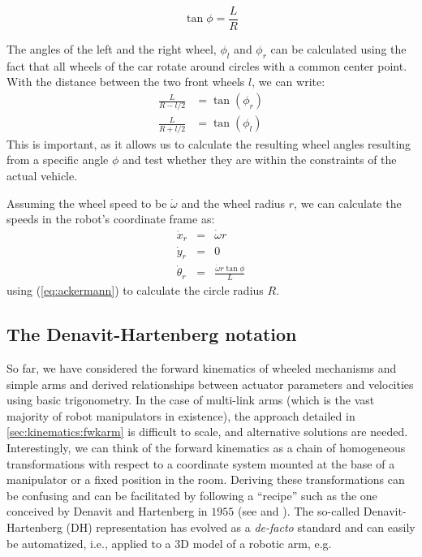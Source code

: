 \begin{equation}\label{eq:ackermann}
\tan \phi = \frac{L}{R}
\end{equation}

The angles of the left and the right wheel, $ \phi_l$ and $ \phi_r$ can be calculated using the fact that all wheels of the car rotate around circles with a common center point. With the distance between the two front wheels $l$, we can write:
\begin{eqnarray}
\frac{L}{R-l/2}&=\tan{(\phi_r)} \nonumber \\
\frac{L}{R+l/2}&=\tan{(\phi_l)}
\end{eqnarray}
This is important, as it allows us to calculate the resulting wheel angles resulting from a specific angle $\phi$ and test whether they are within the constraints of the actual vehicle.

Assuming the wheel speed to be $\dot{\omega}$ and the wheel radius $r$, we can calculate the speeds in the robot's coordinate frame as:
\begin{eqnarray}
\dot{x}_r&=&\dot{\omega}r \nonumber \\
\dot{y}_r&=&0\\
\dot{\theta}_r&=&\frac{\dot{\omega}r\tan\phi}{L} \nonumber
\end{eqnarray}
using (\ref{eq:ackermann}) to calculate the circle radius $R$.

\subsection{The Denavit-Hartenberg notation}\label{sec:kinematics:fwk:dh}

So far, we have considered the forward kinematics of wheeled mechanisms and simple arms and derived relationships between actuator parameters and velocities using basic trigonometry.
In the case of multi-link arms (which is the vast majority of robot manipulators in existence), the approach detailed in \cref{sec:kinematics:fwkarm} is difficult to scale, and alternative solutions are needed.
Interestingly, we can think of the forward kinematics as a chain of homogeneous transformations with respect to a coordinate system mounted at the base of a manipulator or a fixed position in the room.
Deriving these transformations can be confusing and can be facilitated by following a ``recipe'' such as the one conceived by Denavit and Hartenberg in $1955$ (see \cite{hartenberg1955kinematic} and \cite{craig2009introduction}).
The so-called Denavit-Hartenberg (DH) representation has evolved as a \textsl{de-facto} standard and can easily be automatized, i.e., applied to a 3D model of a robotic arm, e.g. 

